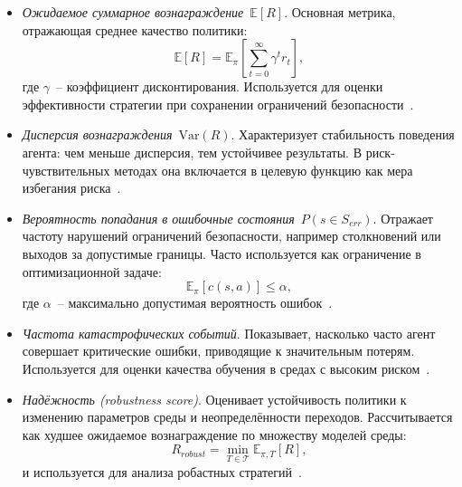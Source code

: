 \begin{itemize}

    \item \emph{Ожидаемое суммарное вознаграждение}~$\mathbb{E}[R]$.  
    Основная метрика, отражающая среднее качество политики:
    \begin{equation}
    \mathbb{E}[R] = \mathbb{E}_\pi \left[\sum_{t=0}^{\infty} \gamma^t r_t \right],
    \end{equation}
    где $\gamma$~-- коэффициент дисконтирования.  
    Используется для оценки эффективности стратегии при сохранении ограничений безопасности~\cite{mihatsch2002, geibel2005}.

    \item \emph{Дисперсия вознаграждения}~$\mathrm{Var}(R)$.  
    Характеризует стабильность поведения агента: чем меньше дисперсия, тем устойчивее результаты.  
    В риск-чувствительных методах она включается в целевую функцию как мера избегания риска~\cite{mihatsch2002, borkar2002}.

    \item \emph{Вероятность попадания в ошибочные состояния}~$P(s \in S_{err})$.  
    Отражает частоту нарушений ограничений безопасности, например столкновений или выходов за допустимые границы.  
    Часто используется как ограничение в оптимизационной задаче:
    \begin{equation}
    \mathbb{E}_\pi[c(s,a)] \leq \alpha,
    \end{equation}
    где $\alpha$~-- максимально допустимая вероятность ошибок~\cite{geibel2005, moldovan2012}.

    \item \emph{Частота катастрофических событий}.  
    Показывает, насколько часто агент совершает критические ошибки, приводящие к значительным потерям.  
    Используется для оценки качества обучения в средах с высоким риском~\cite{gaskett2003, abbeel2005}.

    \item \emph{Надёжность (robustness score)}.  
    Оценивает устойчивость политики к изменению параметров среды и неопределённости переходов.  
    Рассчитывается как худшее ожидаемое вознаграждение по множеству моделей среды:
    \begin{equation}
    R_{robust} = \min_{T \in \mathcal{T}} \mathbb{E}_{\pi, T}[R],
    \end{equation}
    и используется для анализа робастных стратегий~\cite{heger1994, moldovan2012}.

\end{itemize}


